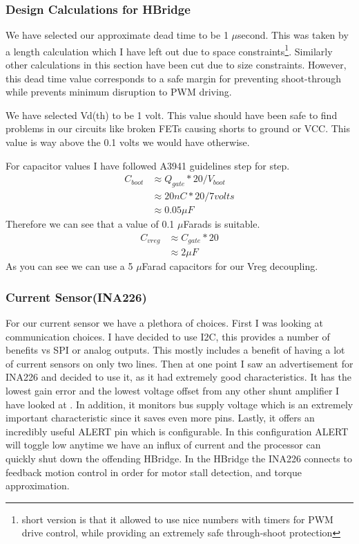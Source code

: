 \documentclass[12pt]{article}
\begin{document}
\subsubsection{Design Calculations for HBridge}
We have selected our approximate dead time to be 1 $\mu$second. This was taken by a length calculation which I have left out due to space constraints\footnote{short version is that it allowed to use nice numbers with timers for PWM drive control, while providing an extremely safe through-shoot protection}. Similarly other calculations in this section have been cut due to size constraints. However, this dead time value corresponds to a safe margin for preventing shoot-through while prevents minimum disruption to PWM driving.

We have selected Vd(th) to be 1 volt. This value should have been safe to find problems in our circuits like broken FETs causing shorts to ground or VCC. This value is way above the 0.1 volts we would have otherwise.

For capacitor values I have followed A3941 guidelines step for step.  
\begin{align}
C_{boot} &\approx Q_{gate} * 20 / V_{boot}
\\ &\approx 20 nC * 20 / 7 volts
\\ &\approx 0.05 \mu F
\end{align}
Therefore we can see that a value of 0.1 $\mu$Farads is suitable.
\begin{align}
C_{vreg} &\approx C_{gate} * 20
\\ &\approx 2 \mu F
\end{align}
As you can see we can use a 5 $\mu$Farad capacitors for our Vreg decoupling.
\subsubsection{Current Sensor(INA226)}
For our current sensor we have a plethora of choices. First I was looking at communication choices. I have decided to use I2C, this provides a number of benefits vs SPI or analog outputs. This mostly includes a benefit of having a lot of current sensors on only two lines. Then at one point I saw an advertisement for INA226 and decided to use it, as it had extremely good characteristics. It has the lowest gain error and the lowest voltage offset from any other shunt amplifier I have looked at . In addition, it monitors bus supply voltage which is an extremely important characteristic since it saves even more pins. Lastly, it offers an incredibly useful ALERT pin which is configurable. In this configuration ALERT will toggle low anytime we have an influx of current and the processor can quickly shut down the offending HBridge. In the HBridge the INA226 connects to feedback motion control in order for motor stall detection, and torque approximation. 
\end{document}
